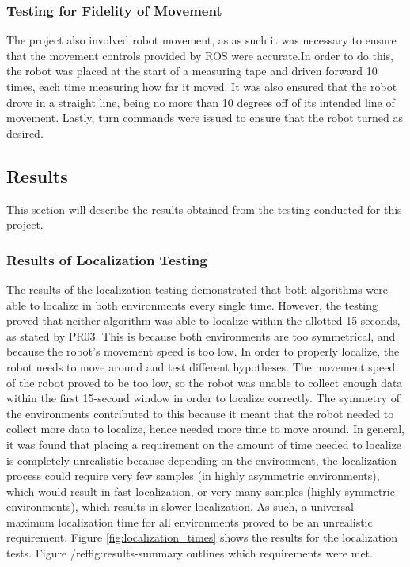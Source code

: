 \documentclass{article}
\newcommand\tab[1][0.5cm]{\hspace*{#1}}
\begin{document}
\subsubsection{Testing for Fidelity of Movement}
\tab The project also involved robot movement, as as such it was necessary to ensure that the movement controls provided by ROS were accurate.In order to do this, the robot was placed at the start of a measuring tape and driven forward 10 times, each time measuring how far it moved. It was also ensured that the robot drove in a straight line, being no more than 10 degrees off of its intended line of movement. Lastly, turn commands were issued to ensure that the robot turned as desired.

\subsection{Results}
This section will describe the results obtained from the testing conducted for this project.

\subsubsection{Results of Localization Testing}
\tab The results of the localization testing demonstrated that both algorithms were able to localize in both environments every single time. However, the testing proved that neither algorithm was able to localize within the allotted 15 seconds, as stated by PR03. This is because both environments are too symmetrical, and because the robot's movement speed is too low. In order to properly localize, the robot needs to move around and test different hypotheses. The movement speed of the robot proved to be too low, so the robot was unable to collect enough data within the first 15-second window in order to localize correctly. The symmetry of the environments contributed to this because it meant that the robot needed to collect more data to localize, hence needed more time to move around. In general, it was found that placing a requirement on the amount of time needed to localize is completely unrealistic because depending on the environment, the localization process could require very few samples (in highly asymmetric environments), which would result in fast localization, or very many samples (highly symmetric environments), which results in slower localization. As such, a universal maximum localization time for all environments proved to be an unrealistic requirement. Figure \ref{fig:localization_times} shows the results for the localization tests. Figure /ref{fig:results-summary} outlines which requirements were met.
\end{document}
